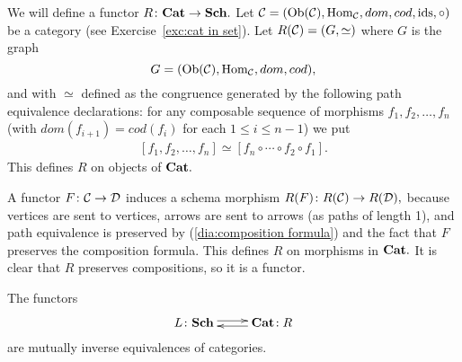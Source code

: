 \documentclass[CT4S-EN-RU]{subfiles}
\begin{document}
\begin{constructionRUS}
\end{constructionRUS}

\begin{constructionENG}
We will define a functor $R\colon{\mathbf{Cat}}\rightarrow{\mathbf{Sch}}.$ Let $\mathcal{C}=(\textnormal{Ob}(\mathcal{C}),\textnormal{Hom}_\mathcal{C},dom,cod,\textnormal{ids},\circ)$ be a category (see Exercise~\ref{exc:cat in set}). Let $R(\mathcal{C})=(G,\simeq)$ where $G$ is the graph $$G=(\textnormal{Ob}(\mathcal{C}),\textnormal{Hom}_\mathcal{C},dom,cod),$$ and with $\simeq$ defined as the congruence generated by the following path equivalence declarations: for any composable sequence of morphisms $f_1,f_2,\ldots,f_n$ (with $dom(f_{i+1})=cod(f_i)$ for each $1\leq i\leq n-1$) we put 
\begin{align}\label{dia:composition formula}
[f_1,f_2,\ldots,f_n]\simeq [f_n\circ\cdots\circ f_2\circ f_1].
\end{align} 
This defines $R$ on objects of ${\mathbf{Cat}}.$ 

A functor $F\colon\mathcal{C}\rightarrow\mathcal{D}$ induces a schema morphism $R(F)\colon R(\mathcal{C})\rightarrow R(\mathcal{D}),$ because vertices are sent to vertices, arrows are sent to arrows (as paths of length 1), and path equivalence is preserved by (\ref{dia:composition formula}) and the fact that $F$ preserves the composition formula. This defines $R$ on morphisms in ${\mathbf{Cat}}.$ It is clear that $R$ preserves compositions, so it is a functor.
\end{constructionENG}

\begin{constructionRUS}
\end{constructionRUS}

\begin{theoremENG}\label{thm:equivalence of categories and schemas}
The functors $$\xymatrix{L\taking\Sch\ar@<.5ex>[r]&\Cat\!:R\ar@<.5ex>[l]}$$ are mutually inverse equivalences of categories.
\end{theoremENG}

\begin{theoremRUS}\label{thm:equivalence of categories and schemas}
\end{theoremRUS}
\end{document}
